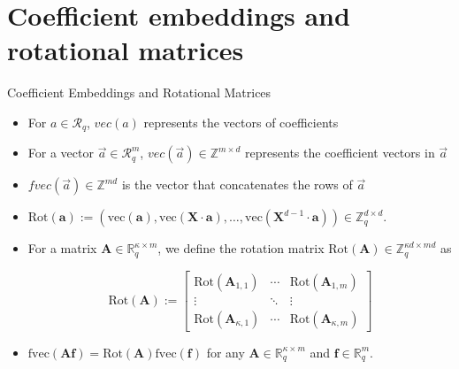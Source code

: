 \section{Coefficient embeddings and rotational matrices}
\begin{frame}
    {Coefficient Embeddings and Rotational Matrices}
    \begin{itemize}
        \item For $a \in \mathcal{R}_q$, $vec(a)$ represents the vectors of coefficients
        \item For a vector $\overrightarrow{a} \in \mathcal{R}^m_q$, $vec(\overrightarrow{a}) \in \mathbb{Z}^{m \times d}$ represents the coefficient vectors in $\overrightarrow{a}$
        \item $fvec(\overrightarrow{a}) \in \mathbb{Z}^{md}$ is the vector that concatenates the rows of $\overrightarrow{a}$
    \end{itemize}

    \begin{itemize}
        \item $\text{Rot}(\mathbf{a}) := (\text{vec}(\mathbf{a}), \text{vec}(\mathbf{X} \cdot \mathbf{a}), \ldots, \text{vec}(\mathbf{X}^{d-1} \cdot \mathbf{a})) \in \mathbb{Z}_q^{d \times d}$.
        \item
              For a matrix $\mathbf{A} \in \mathbb{R}_q^{\kappa \times m}$, we define the rotation matrix $\text{Rot}(\mathbf{A}) \in \mathbb{Z}_q^{\kappa d \times md}$ as

              \[
                  \text{Rot}(\mathbf{A}) :=
                  \begin{bmatrix}
                      \text{Rot}(\mathbf{A}_{1,1})      & \cdots & \text{Rot}(\mathbf{A}_{1,m})      \\
                      \vdots                            & \ddots & \vdots                            \\
                      \text{Rot}(\mathbf{A}_{\kappa,1}) & \cdots & \text{Rot}(\mathbf{A}_{\kappa,m})
                  \end{bmatrix}
              \]

        \item $\text{fvec}(\mathbf{A} \mathbf{f}) = \text{Rot}(\mathbf{A})\text{fvec}(\mathbf{f})$ for any $\mathbf{A} \in \mathbb{R}_q^{\kappa \times m}$ and $\mathbf{f} \in \mathbb{R}_q^m$.
    \end{itemize}

\end{frame}